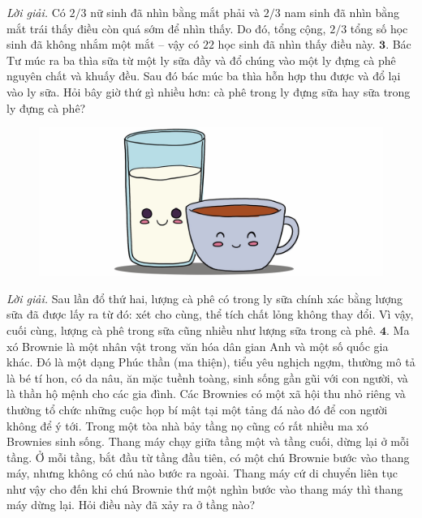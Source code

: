 \begin{multicols}{2}
\begin{figure}[H]
		\vspace*{-15pt}
	\end{figure}
	\textit{Lời giải.} Có $2/3$ nữ sinh đã nhìn bằng mắt phải và $2/3$ nam sinh đã nhìn bằng mắt trái thấy điều còn quá sớm để nhìn thấy. Do đó, tổng cộng, $2/3$ tổng số học sinh đã không nhắm  một mắt -- vậy có $22$ học sinh đã nhìn thấy điều này.
	$\pmb{3.}$ 	Bác Tư múc ra ba thìa sữa từ một ly sữa đầy và đổ chúng vào một ly đựng cà phê nguyên chất và khuấy đều. Sau đó bác múc ba thìa hỗn hợp thu được và đổ lại vào ly sữa. Hỏi bây giờ thứ gì nhiều hơn: cà phê trong ly đựng sữa hay sữa trong ly đựng cà phê?
	\begin{figure}[H]
		\centering
		\vspace*{5pt}
		\captionsetup{labelformat= empty, justification=centering}
		\includegraphics[width=1\linewidth]{Pi4_bai3}
		\vspace*{-15pt}
	\end{figure}
	\textit{Lời giải.} Sau lần đổ thứ hai, lượng cà phê  có  trong ly sữa chính xác bằng lượng sữa đã được lấy ra từ đó: xét cho cùng, thể tích chất lỏng không thay đổi. Vì vậy, cuối cùng, lượng cà phê trong sữa cũng nhiều như lượng sữa trong cà phê.
	\vskip 0.1cm
	$\pmb{4.}$ Ma xó Brownie là một nhân vật trong văn hóa dân gian Anh và một số quốc gia khác. Đó là một dạng Phúc thần (ma thiện), tiểu yêu nghịch ngợm, thường mô tả là bé tí hon, có da nâu, ăn mặc tuềnh toàng, sinh sống gần gũi với con người, và là thần hộ mệnh cho các gia đình. Các Brownies có một xã hội thu nhỏ riêng và thường tổ chức những cuộc họp bí mật tại một tảng đá nào đó để con người không để ý tới. 
	\vskip 0.1cm
	Trong một tòa nhà bảy tầng nọ cũng có rất nhiều ma xó Brownies sinh sống. Thang máy chạy giữa tầng một và tầng cuối, dừng lại ở mỗi tầng. Ở mỗi tầng, bắt đầu từ tầng đầu tiên, có một chú Brownie bước vào thang máy, nhưng không có chú nào bước ra ngoài. Thang máy cứ di chuyển liên tục như vậy cho đến khi chú Brownie thứ một nghìn bước vào thang máy thì thang máy dừng lại. Hỏi điều này đã xảy ra ở tầng nào?

\end{multicols}
